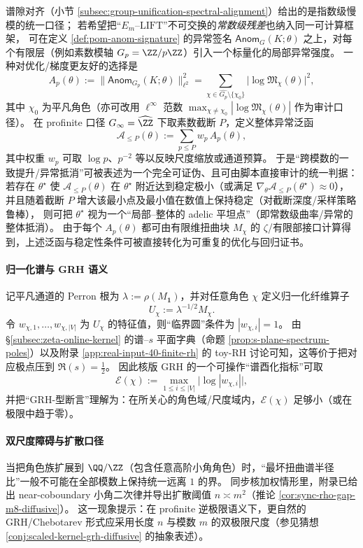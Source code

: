 \begin{remark}\label{rem:pom-adelic-anom-functional}
谱隙对齐（小节 \ref{subsec:group-unification-spectral-alignment}）给出的是指数级慢模的统一口径；
若希望把“\(E_m\)--\(\mathrm{LIFT}\)”不可交换的\emph{常数级残差}也纳入同一可计算框架，
可在定义 \ref{def:pom-anom-signature} 的异常签名 \(\mathsf{Anom}_G(K;\theta)\) 之上，对每个有限层（例如素数模轴 \(G_p=\ZZ/p\ZZ\)）引入一个标量化的局部异常强度。
一种对优化/梯度更友好的选择是
\[
A_p(\theta):=\bigl\|\mathsf{Anom}_{G_p}(K;\theta)\bigr\|_{\ell^2}^2
=\sum_{\chi\in\widehat{G_p}\setminus\{\chi_0\}}\bigl|\log\mathfrak{M}_\chi(\theta)\bigr|^2,
\]
其中 \(\chi_0\) 为平凡角色（亦可改用 \(\ell^\infty\) 范数 \(\max_{\chi\ne\chi_0}|\log\mathfrak{M}_\chi(\theta)|\) 作为审计口径）。
在 profinite 口径 \(G_\infty=\widehat{\ZZ}\) 下取素数截断 \(P\)，定义整体异常泛函
\[
\mathcal{A}_{\le P}(\theta):=\sum_{p\le P} w_p\,A_p(\theta),
\]
其中权重 \(w_p\) 可取 \(\log p\)、\(p^{-2}\) 等以反映尺度缩放或通道预算。
于是“跨模数的一致提升/异常抵消”可被表述为一个完全可证伪、且可由脚本直接审计的统一判据：
若存在 \(\theta^\star\) 使 \(\mathcal{A}_{\le P}(\theta)\) 在 \(\theta^\star\) 附近达到稳定极小（或满足 \(\nabla_\theta\mathcal{A}_{\le P}(\theta^\star)\approx 0\)），
并且随着截断 \(P\) 增大该最小点及最小值在数值上保持稳定（对截断深度/采样策略鲁棒），
则可把 \(\theta^\star\) 视为一个“局部--整体的 adelic 平坦点”（即常数级曲率/异常的整体抵消）。
由于每个 \(A_p(\theta)\) 都可由有限维扭曲块 \(M_\chi\) 的 \(\zeta\)/有限部接口计算得到，上述泛函与稳定性条件可被直接转化为可重复的优化与回归证书。
\end{remark}

\paragraph{归一化谱与 GRH 语义}
记平凡通道的 Perron 根为 \(\lambda:=\rho(M_{\mathbf{1}})\)，并对任意角色 \(\chi\) 定义归一化纤维算子
\[
U_\chi:=\lambda^{-1/2}M_\chi.
\]
令 \(w_{\chi,1},\dots,w_{\chi,|V|}\) 为 \(U_\chi\) 的特征值，则“临界圆”条件为 \(|w_{\chi,i}|=1\)。
由 \S\ref{subsec:zeta-online-kernel} 的谱--\(s\) 平面字典（命题 \ref{prop:s-plane-spectrum-poles}）以及附录 \ref{app:real-input-40-finite-rh} 的 toy-RH 讨论可知，这等价于把对应极点压到 \(\Re(s)=\tfrac12\)。
因此核版 GRH 的一个可操作“谱酉化指标”可取
\[
\mathcal{E}(\chi):=\max_{1\le i\le |V|}\bigl|\log|w_{\chi,i}|\bigr|,
\]
并把“GRH-型断言”理解为：在所关心的角色域/尺度域内，\(\mathcal{E}(\chi)\) 足够小（或在极限中趋于零）。

\paragraph{双尺度障碍与扩散口径}
当把角色族扩展到 \(\QQ/\ZZ\)（包含任意高阶小角角色）时，“最坏扭曲谱半径比”一般不可能在全部模数上保持统一远离 \(1\) 的界。
同步核加权情形里，附录已给出 near-coboundary 小角二次律并导出扩散阈值 \(n\asymp m^2\)（推论 \ref{cor:sync-rho-gap-m8-diffusive}）。
这一现象提示：在 profinite 逆极限语义下，更自然的 GRH/Chebotarev 形式应采用长度 \(n\) 与模数 \(m\) 的双极限尺度（参见猜想 \ref{conj:scaled-kernel-grh-diffusive} 的抽象表述）。
